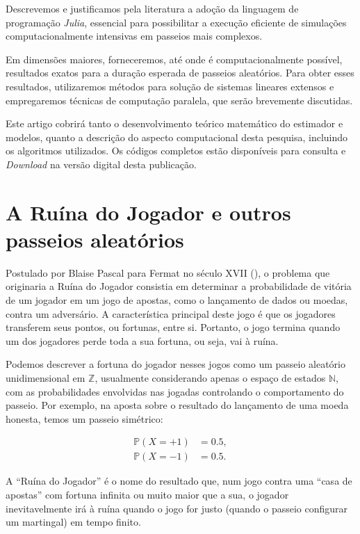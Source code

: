 \documentclass[
  brazilian,
  12pt,
]{article}
\theoremstyle{definition}
\theoremstyle{definition}
\theoremstyle{remark}
\begin{document}
Descrevemos e justificamos pela literatura a adoção da linguagem de
programação \emph{Julia}, essencial para possibilitar a execução
eficiente de simulações computacionalmente intensivas em passeios mais
complexos.

Em dimensões maiores, forneceremos, até onde é computacionalmente
possível, resultados exatos para a duração esperada de passeios
aleatórios. Para obter esses resultados, utilizaremos métodos para
solução de sistemas lineares extensos e empregaremos técnicas de
computação paralela, que serão brevemente discutidas.

Este artigo cobrirá tanto o desenvolvimento teórico matemático do
estimador e modelos, quanto a descrição do aspecto computacional desta
pesquisa, incluindo os algoritmos utilizados. Os códigos completos estão
disponíveis para consulta e \emph{Download} na versão digital desta
publicação.

\section{A Ruína do Jogador e outros passeios
aleatórios}\label{a-ruuxedna-do-jogador-e-outros-passeios-aleatuxf3rios}

Postulado por Blaise Pascal para Fermat no século XVII
(), o
problema que originaria a Ruína do Jogador consistia em determinar a
probabilidade de vitória de um jogador em um jogo de apostas, como o
lançamento de dados ou moedas, contra um adversário. A característica
principal deste jogo é que os jogadores transferem seus pontos, ou
fortunas, entre si. Portanto, o jogo termina quando um dos jogadores
perde toda a sua fortuna, ou seja, vai à ruína.

Podemos descrever a fortuna do jogador nesses jogos como um passeio
aleatório unidimensional em \(\mathbb{Z}\), usualmente considerando
apenas o espaço de estados \(\mathbb{N}\), com as probabilidades
envolvidas nas jogadas controlando o comportamento do passeio. Por
exemplo, na aposta sobre o resultado do lançamento de uma moeda honesta,
temos um passeio simétrico:

\[
\begin{aligned}
\mathbb{P}(X = +1) &= 0.5, \\
\mathbb{P}(X = -1) &= 0.5.
\end{aligned}
\]

A ``Ruína do Jogador'' é o nome do resultado que, num jogo contra uma
``casa de apostas'' com fortuna infinita ou muito maior que a sua, o
jogador inevitavelmente irá à ruína quando o jogo for justo (quando o
passeio configurar um martingal) em tempo finito.
\end{document}
